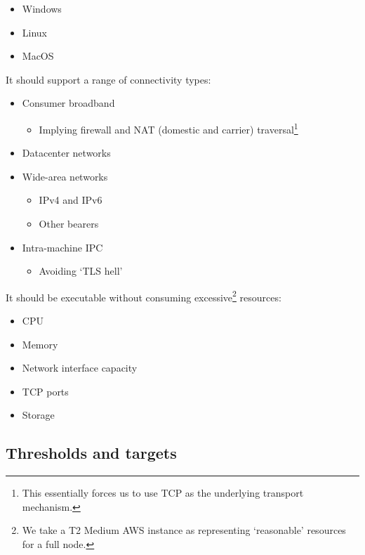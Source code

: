 \documentclass[11pt,a4paper]{article}
\begin{document}
\begin{itemize}
\item
  Windows
\item
  Linux
\item
  MacOS
\end{itemize}

It should support a range of connectivity types:

\begin{itemize}
\item
  Consumer broadband

  \begin{itemize}
  \item
    Implying firewall and NAT (domestic and carrier) traversal\footnote{This
      essentially forces us to use TCP as the underlying transport
      mechanism.}
  \end{itemize}
\item
  Datacenter networks
\item
  Wide-area networks

  \begin{itemize}
  \item
    IPv4 and IPv6
  \item
    Other bearers
  \end{itemize}
\item
  Intra-machine IPC

  \begin{itemize}
  \item
    Avoiding `TLS hell'
  \end{itemize}
\end{itemize}

It should be executable without consuming excessive\footnote{We take a
  T2 Medium AWS instance as representing `reasonable' resources for a
  full node.} resources:

\begin{itemize}
\item
  CPU
\item
  Memory
\item
  Network interface capacity
\item
  TCP ports
\item
  Storage
\end{itemize}

\subsection{Thresholds and targets}
\label{thresholds-and-targets}
\end{document}
